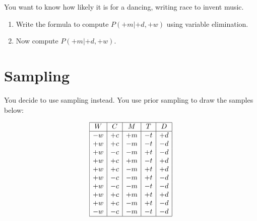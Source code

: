\documentclass[12pt]{article}
\begin{document}
\noindent
You want to know how likely it is for a dancing, writing race to
invent music.

\begin{enumerate}

\item Write the formula to compute $P(+m | +d, +w)$ using variable elimination.

\item Now compute $P(+m | +d, +w)$.

\end{enumerate}

\clearpage

\section{Sampling}

You decide to use sampling instead.  You use prior sampling to draw
the samples below:

$$\begin{array}{|c|c|c|c|c|} \hline
W  & C  & M  & T  & D  \\ \hline
-w & +c & +m & -t & +d \\
+w & +c & -m & -t & -d \\
+w & -c & -m & +t & -d \\
+w & +c & +m & -t & +d \\
+w & +c & -m & +t & +d \\
+w & -c & -m & +t & -d \\
+w & -c & -m & -t & -d \\
+w & +c & +m & +t & +d \\
+w & +c & -m & +t & -d \\
-w & -c & -m & -t & -d \\ \hline
\end{array}$$
\end{document}
